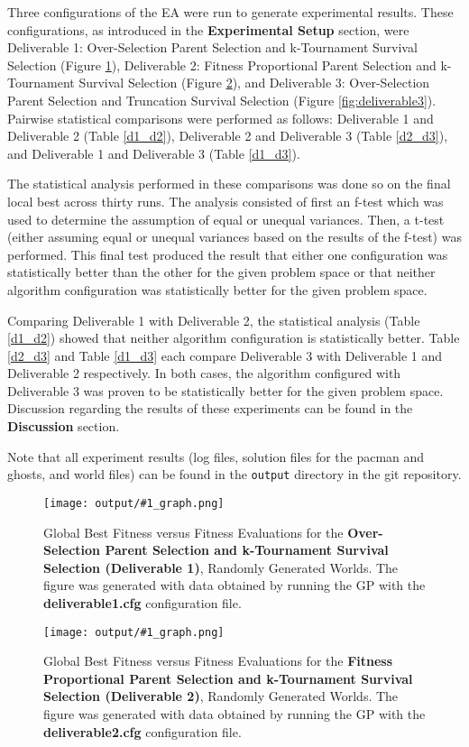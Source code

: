 \documentclass[11pt]{article}
\newcommand{\fitnessplotcaption}[2]{\caption{Global Best Fitness versus Fitness Evaluations for the \textbf{{#1}}, Randomly Generated Worlds. The figure was generated with data obtained by running the GP with the \textbf{{#2}} configuration file.}}
\newcommand{\addgraphic}[1]{\centerline{\texttt{[image: output/\#1\_graph.png]}}}
\begin{document}
Three configurations of the EA were run to generate experimental results. These configurations, as introduced in the 
\textbf{Experimental Setup} section, were Deliverable 1: Over-Selection Parent 
Selection and k-Tournament Survival Selection (Figure \ref{fig:deliverable1}), Deliverable 2: Fitness Proportional 
Parent Selection and k-Tournament Survival Selection (Figure \ref{fig:deliverable2}), and Deliverable 3: Over-Selection Parent Selection 
and Truncation Survival Selection (Figure \ref{fig:deliverable3}). Pairwise statistical comparisons were performed as follows:
Deliverable 1 and Deliverable 2 (Table \ref{d1_d2}), Deliverable 2 and Deliverable 3 (Table \ref{d2_d3}), and Deliverable 1 and Deliverable
3 (Table \ref{d1_d3}).

The statistical analysis performed in these comparisons was done so on the final local best across thirty runs. The analysis consisted 
of first an f-test which was used to determine the assumption of equal or unequal variances. Then, a t-test (either assuming equal or unequal
variances based on the results of the f-test) was performed. This final test produced the result that either one configuration was
statistically better than the other for the given problem space or that neither algorithm configuration was statistically better 
for the given problem space.

Comparing Deliverable 1 with Deliverable 2, the statistical analysis (Table \ref{d1_d2}) showed that neither algorithm 
configuration is statistically better. Table \ref{d2_d3} and Table \ref{d1_d3} each compare Deliverable 3 with Deliverable 1 
and Deliverable 2 respectively. In both cases, the
algorithm configured with Deliverable 3 was proven to be statistically better for the given problem space. 
Discussion regarding the results of these experiments can be found in the \textbf{Discussion} section.

Note that all experiment results (log files, solution files for the pacman and ghosts, and world files) can be
found in the \texttt{output} directory in the git repository.

\begin{figure}[H]
    \addgraphic{deliverable1}
    \fitnessplotcaption{Over-Selection Parent Selection and k-Tournament Survival Selection (Deliverable 1)}{deliverable1.cfg}
    \label{fig:deliverable1}
\end{figure}

\begin{figure}[H]
    \addgraphic{deliverable2}
    \fitnessplotcaption{Fitness Proportional Parent Selection and k-Tournament Survival Selection (Deliverable 2)}{deliverable2.cfg}
    \label{fig:deliverable2}
\end{figure}
\end{document}
